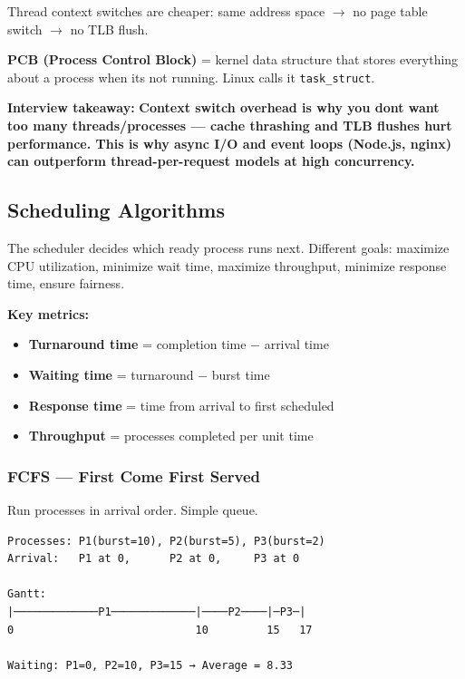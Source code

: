 \documentclass[11pt]{article}
\providecommand{\tightlist}{\setlength{\itemsep}{1pt}\setlength{\parskip}{0pt}}
\begin{document}
Thread context switches are cheaper: same address space \(\rightarrow\) no page table switch \(\rightarrow\) no TLB flush.

\textbf{PCB (Process Control Block)} = kernel data structure that stores everything about a process when it\textquotesingle s not running. Linux calls it \texttt{task\_struct}.

\textbf{Interview takeaway:} \textbf{Context switch overhead is why you don\textquotesingle t want too many threads/processes --- cache thrashing and TLB flushes hurt performance. This is why async I/O and event loops (Node.js, nginx) can outperform thread-per-request models at high concurrency.}

\subsection{Scheduling Algorithms}\label{scheduling-algorithms}


The scheduler decides which ready process runs next. Different goals: maximize CPU utilization, minimize wait time, maximize throughput, minimize response time, ensure fairness.

\textbf{Key metrics:}

\begin{itemize}
\tightlist
\item
  \textbf{Turnaround time} = completion time \(-\) arrival time
\item
  \textbf{Waiting time} = turnaround \(-\) burst time
\item
  \textbf{Response time} = time from arrival to first scheduled
\item
  \textbf{Throughput} = processes completed per unit time
\end{itemize}

\subsubsection{FCFS --- First Come First Served}\label{fcfs--first-come-first-served}

Run processes in arrival order. Simple queue.

\setcodelang{}

\begin{verbatim}
Processes: P1(burst=10), P2(burst=5), P3(burst=2)
Arrival:   P1 at 0,      P2 at 0,     P3 at 0

Gantt:
|─────────────P1─────────────|────P2────|─P3─|
0                            10         15   17

Waiting: P1=0, P2=10, P3=15 → Average = 8.33
\end{verbatim}
\end{document}
